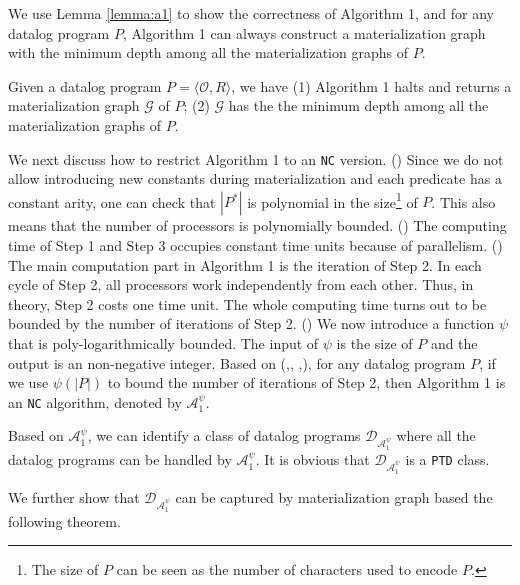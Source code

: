 \documentclass{article}
\begin{document}
We use Lemma \ref{lemma:a1} to show the correctness of Algorithm 1, and for any datalog program $P$, Algorithm 1 can always construct a materialization graph with the minimum depth among all the materialization graphs of $P$.

\begin{lemma}\label{lemma:a1}
Given a datalog program $P=\langle\mathcal{O}, R\rangle$, we have (1) Algorithm 1 halts and returns a materialization graph $\mathcal{G}$ of $P$; (2) $\mathcal{G}$ has the the minimum depth among all the materialization graphs of $P$.
\end{lemma}

We next discuss how to restrict Algorithm 1 to an \texttt{NC} version. (\uppercase\expandafter{}) Since we do not allow introducing new constants during materialization and each predicate has a constant arity, one can check that $|P^*|$ is polynomial in the size\footnote{The size of $P$ can be seen as the number of characters used to encode $P$.} of $P$. This also means that the number of processors is polynomially bounded. (\uppercase\expandafter{}) The computing time of Step 1 and Step 3 occupies constant time units because of parallelism. (\uppercase\expandafter{}) The main computation part in Algorithm 1 is the iteration of Step 2. In each cycle of Step 2, all processors work independently from each other. Thus, in theory, Step 2 costs one time unit. The whole computing time turns out to be bounded by the number of iterations of Step 2. (\uppercase\expandafter{})
We now introduce a function $\psi$ that is poly-logarithmically bounded.  The input of $\psi$ is the size of $P$ and the output is an non-negative integer. Based on (\uppercase\expandafter{},\uppercase\expandafter{},
\uppercase\expandafter{},\uppercase\expandafter{}), for any datalog program $P$, if we use $\psi(|P|)$ to
bound the number of iterations of Step 2, then Algorithm 1 is an \texttt{NC} algorithm, denoted by $\mathcal{A}_1^{\psi}$.

Based on $\mathcal{A}_1^{\psi}$, we can identify a class of datalog programs $\mathcal{D}_{\mathcal{A}_1^{\psi}}$ where all the datalog programs can be handled by $\mathcal{A}_1^{\psi}$. It is obvious that $\mathcal{D}_{\mathcal{A}_1^{\psi}}$ is a \texttt{PTD} class.

We further show that $\mathcal{D}_{\mathcal{A}_1^{\psi}}$ can be captured by materialization graph based the following theorem.
\end{document}
